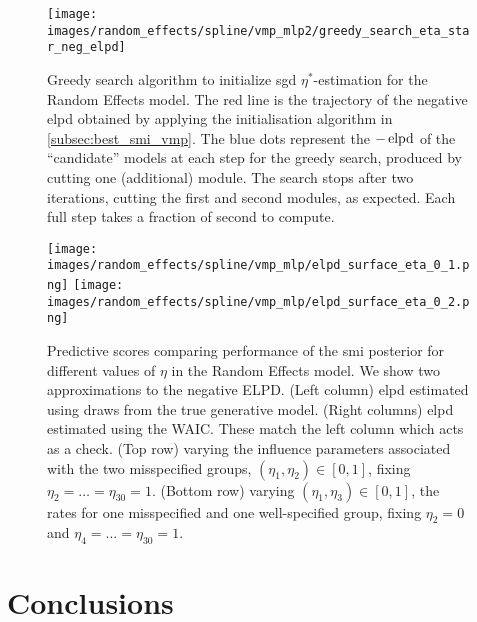 \begin{figure}[!htb]
\texttt{[image: images/random\_effects/spline/vmp\_mlp2/greedy\_search\_eta\_star\_neg\_elpd]}
\caption[Random Effects model VMP map]{
  Greedy search algorithm to initialize \acrshort*{sgd} $\eta^*$-estimation for the Random Effects model. The red line is the trajectory of the negative \acrshort*{elpd} obtained by applying the initialisation algorithm in \cref{subsec:best_smi_vmp}. The blue dots represent the $-\operatorname{\text{elpd}}$ of the ``candidate'' models at each step for the greedy search, produced by cutting one (additional) module. The search stops after two iterations, cutting the first and second modules, as expected. Each full step takes a fraction of second to compute.
  }
\label{fig:rnd_eff_greedy_search}
\end{figure}

\begin{figure}[!htb]
  \centering
  \texttt{[image: images/random\_effects/spline/vmp\_mlp/elpd\_surface\_eta\_0\_1.png]}
  \texttt{[image: images/random\_effects/spline/vmp\_mlp/elpd\_surface\_eta\_0\_2.png]}

  \caption[Random Effects model ELPD]{
    Predictive scores comparing performance of the \acrshort*{smi} posterior for different values of $\eta$ in the Random Effects model.
    We show two approximations to the negative ELPD. %
    (Left column) \acrshort*{elpd} estimated using draws from the true generative model.
    (Right columns) \acrshort*{elpd} estimated using the WAIC. These match the left column which acts as a check. %
    (Top row) varying the influence parameters associated with the two misspecified groups, $(\eta_1,\eta_2)\in[0,1]$, fixing $\eta_2=\ldots=\eta_{30}=1$. (Bottom row) varying $(\eta_1,\eta_3)\in[0,1]$, the rates for one misspecified and one well-specified group, fixing $\eta_2=0$ and $\eta_4=...=\eta_{30}=1$.
  }
  \label{fig:rnd_eff_elpd}
\end{figure}

\section{Conclusions}

